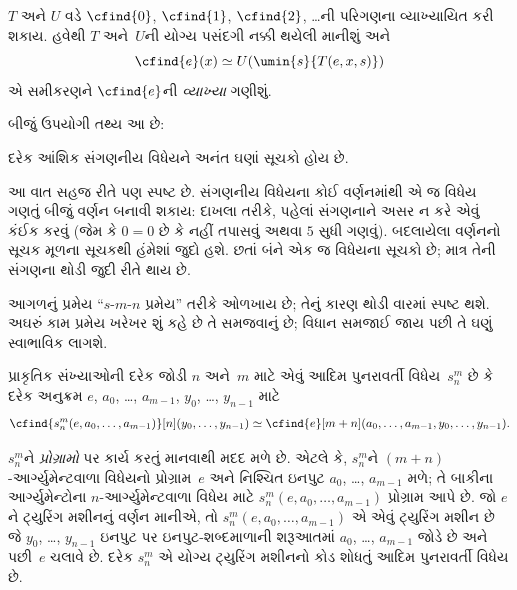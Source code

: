 $T$ અને $U$ વડે $\cfind{0}$, $\cfind{1}$, $\cfind{2}$, \dots{}ની
પરિગણના વ્યાખ્યાયિત કરી શકાય. હવેથી $T$ અને~$U$ની યોગ્ય પસંદગી
નક્કી થયેલી માનીશું અને
\[
\cfind{e}(x) \simeq U(\umin{s}{T(e,x,s)})
\]
એ સમીકરણને $\cfind{e}$ની \emph{વ્યાખ્યા} ગણીશું.

બીજું ઉપયોગી તથ્ય આ છે:

\begin{thm}
દરેક આંશિક સંગણનીય વિધેયને અનંત ઘણાં સૂચકો હોય છે.
\end{thm}

આ વાત સહજ રીતે પણ સ્પષ્ટ છે. સંગણનીય વિધેયના કોઈ વર્ણનમાંથી
એ જ વિધેય ગણતું બીજું વર્ણન બનાવી શકાય: દાખલા તરીકે, પહેલાં
સંગણનાને અસર ન કરે એવું કંઈક કરવું (જેમ કે $0=0$ છે કે નહીં
તપાસવું અથવા $5$ સુધી ગણવું). બદલાયેલા વર્ણનનો સૂચક મૂળના
સૂચકથી હંમેશાં જુદો હશે. છતાં બંને એક જ વિધેયના સૂચકો છે;
માત્ર તેની સંગણના થોડી જુદી રીતે થાય છે.
\endgroup


\begingroup
\makeatletter{}\makeatother

\label{guunit:OLP-0232}


\begin{explain}
આગળનું પ્રમેય ``$s$-$m$-$n$ પ્રમેય'' તરીકે ઓળખાય છે; તેનું કારણ
થોડી વારમાં સ્પષ્ટ થશે. અઘરું કામ પ્રમેય ખરેખર શું કહે છે તે
સમજવાનું છે; વિધાન સમજાઈ જાય પછી તે ઘણું સ્વાભાવિક લાગશે.
\end{explain}

\begin{thm}
  પ્રાકૃતિક સંખ્યાઓની દરેક જોડી $n$ અને~$m$ માટે એવું આદિમ
  પુનરાવર્તી વિધેય~$s^m_n$ છે કે દરેક અનુક્રમ
  $e$, $a_0$, \dots, $a_{m-1}$, $y_0$, \dots, $y_{n-1}$ માટે
  \[
  \cfind{s^m_n(e, a_0, \dots, a_{m-1})}[n](y_0, \dots, y_{n-1}) \simeq
  \cfind{e}[m+n](a_0, \dots, a_{m-1}, y_0, \dots, y_{n-1}).
\]
\end{thm}

\begin{explain}
$s^m_n$ને \emph{પ્રોગ્રામો} પર કાર્ય કરતું માનવાથી મદદ મળે છે.
એટલે કે, $s^m_n$ને $(m+n)$-આર્ગ્યુમેન્ટવાળા વિધેયનો
પ્રોગ્રામ~$e$ અને નિશ્ચિત ઇનપુટ $a_0$, \dots, $a_{m-1}$ મળે;
તે બાકીના આર્ગ્યુમેન્ટોના $n$-આર્ગ્યુમેન્ટવાળા વિધેય માટે
$s^m_n(e,a_0,\dots,a_{m-1})$ પ્રોગ્રામ આપે છે.
 જો $e$ને ટ્યુરિંગ મશીનનું વર્ણન માનીએ, તો
$s^m_n(e,a_0,\dots,a_{m-1})$ એ એવું ટ્યુરિંગ મશીન છે જે
$y_0$, \dots, $y_{n-1}$ ઇનપુટ પર ઇનપુટ-શબ્દમાળાની શરૂઆતમાં
$a_0$, \dots, $a_{m-1}$ જોડે છે અને પછી~$e$ ચલાવે છે.
દરેક $s^m_n$ એ યોગ્ય ટ્યુરિંગ મશીનનો કોડ શોધતું આદિમ
પુનરાવર્તી વિધેય છે.
\end{explain}
\endgroup


